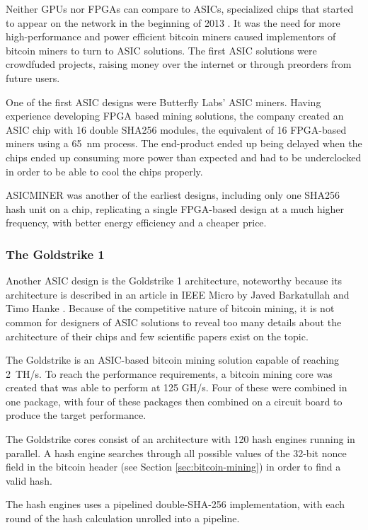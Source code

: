 Neither GPUs nor FPGAs can compare to ASICs, specialized chips that started to appear on the network
in the beginning of 2013 \cite{first-asic-miner}. It was the need for more high-performance and power
efficient bitcoin miners caused implementors of bitcoin miners to turn to ASIC solutions. The first
ASIC solutions were crowdfuded projects, raising money over the internet or through preorders from
future users.

One of the first ASIC designs were Butterfly Labs' ASIC miners. Having experience developing
FPGA based mining solutions, the company created an ASIC chip with 16 double SHA256 modules,
the equivalent of 16 FPGA-based miners using a 65~nm process. The end-product ended up being
delayed when the chips ended up consuming more power than expected and had to be underclocked
in order to be able to cool the chips properly.

ASICMINER was another of the earliest designs, including only one SHA256 hash unit on a chip,
replicating a single FPGA-based design at a much higher frequency, with better energy efficiency
and a cheaper price. \cite{bespoke-silicon}

\subsubsection{The Goldstrike 1}
Another ASIC design is the Goldstrike 1 architecture, noteworthy because its architecture is
described in an article in IEEE Micro by Javed Barkatullah and Timo Hanke \cite{goldstrike}.
Because of the competitive nature of bitcoin mining, it is not common for designers of ASIC
solutions to reveal too many details about the architecture of their chips and few scientific
papers exist on the topic.

The Goldstrike is an ASIC-based bitcoin mining solution capable of reaching 2~TH/s. To reach the performance
requirements, a bitcoin mining core was created that was able to perform at 125 GH/s. Four of
these were combined in one package, with four of these packages then combined on a circuit board
to produce the target performance.

The Goldstrike cores consist of an architecture with 120 hash engines running in parallel.
A hash engine searches through all possible values of the 32-bit nonce field in the bitcoin header
(see Section \ref{sec:bitcoin-mining}) in order to find a valid hash.

The hash engines uses a pipelined double-SHA-256 implementation, with each round of the hash calculation
unrolled into a pipeline.

